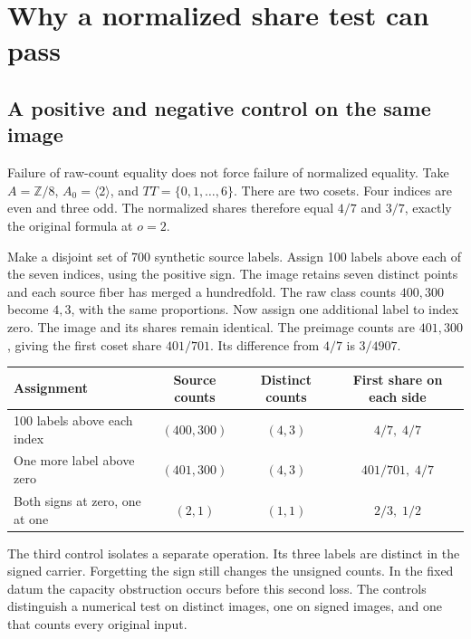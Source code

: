 \documentclass[12pt,letterpaper]{article}
\begin{document}
\section{Why a normalized share test can pass}
\subsection{A positive and negative control on the same image}
Failure of raw-count equality does not force failure of normalized equality. Take $A=\mathbb Z/8$, $A_0=\langle2\rangle$, and $TT=\{0,1,\ldots,6\}$. There are two cosets. Four indices are even and three odd. The normalized shares therefore equal $4/7$ and $3/7$, exactly the original formula at $o=2$.

Make a disjoint set of 700 synthetic source labels. Assign 100 labels above each of the seven indices, using the positive sign. The image retains seven distinct points and each source fiber has merged a hundredfold. The raw class counts $400,300$ become $4,3$, with the same proportions. Now assign one additional label to index zero. The image and its shares remain identical. The preimage counts are $401,300$, giving the first coset share $401/701$. Its difference from $4/7$ is $3/4907$.
\begin{center}\small
\begin{tabular}{@{}lccc@{}}\toprule
Assignment & Source counts & Distinct counts & First share on each side\\\midrule
100 labels above each index & $(400,300)$ & $(4,3)$ & $4/7,\;4/7$\\
One more label above zero & $(401,300)$ & $(4,3)$ & $401/701,\;4/7$\\
Both signs at zero, one at one & $(2,1)$ & $(1,1)$ & $2/3,\;1/2$\\\bottomrule
\end{tabular}
\end{center}
The third control isolates a separate operation. Its three labels are distinct in the signed carrier. Forgetting the sign still changes the unsigned counts. In the fixed datum the capacity obstruction occurs before this second loss. The controls distinguish a numerical test on distinct images, one on signed images, and one that counts every original input.
\end{document}
